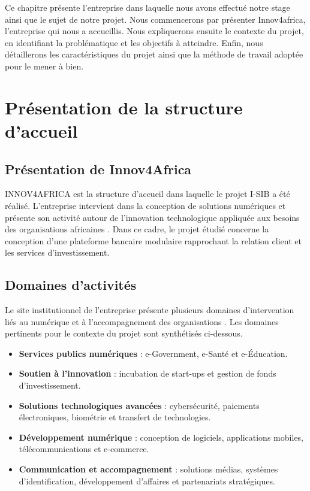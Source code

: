 \documentclass[a4paper,12pt]{report}
\begin{document}
Ce chapitre présente l'entreprise dans laquelle nous avons effectué notre stage ainsi que le
sujet de notre projet. Nous commencerons par présenter Innov4africa, l'entreprise qui nous a
accueillis. Nous expliquerons ensuite le contexte du projet, en identifiant la problématique et les
objectifs à atteindre. Enfin, nous détaillerons les caractéristiques du projet ainsi que la méthode de
travail adoptée pour le mener à bien.

\section{Présentation de la structure d'accueil}

\subsection{Présentation de Innov4Africa}
INNOV4AFRICA est la structure d'accueil dans laquelle le projet I-SIB a été
réalisé. L'entreprise intervient dans la conception de solutions numériques et
présente son activité autour de l'innovation technologique appliquée aux besoins
des organisations africaines \cite{innov4africa_officiel}. Dans ce cadre, le
projet étudié concerne la conception d'une plateforme bancaire modulaire
rapprochant la relation client et les services d'investissement.

\subsection{Domaines d'activités}

Le site institutionnel de l'entreprise présente plusieurs domaines d'intervention
liés au numérique et à l'accompagnement des organisations
\cite{innov4africa_officiel}. Les domaines pertinents pour le contexte du
projet sont synthétisés ci-dessous.

\begin{itemize}
    \item \textbf{Services publics numériques} : e-Government, e-Santé et e-Éducation.
    \item \textbf{Soutien à l'innovation} : incubation de start-ups et gestion de fonds d'investissement.
    \item \textbf{Solutions technologiques avancées} : cybersécurité, paiements électroniques, biométrie et transfert de technologies.
    \item \textbf{Développement numérique} : conception de logiciels, applications mobiles, télécommunications et e-commerce.
    \item \textbf{Communication et accompagnement} : solutions médias, systèmes d'identification, développement d'affaires et partenariats stratégiques.
\end{itemize}
\vspace{0.5cm}
\newpage{}
\end{document}
